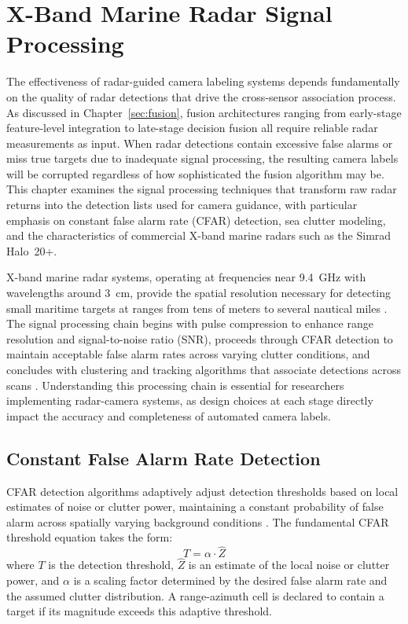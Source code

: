 \section{X-Band Marine Radar Signal Processing}\label{sec:xband}

The effectiveness of radar-guided camera labeling systems depends fundamentally on the quality of radar detections that drive the cross-sensor association process. As discussed in Chapter~\ref{sec:fusion}, fusion architectures ranging from early-stage feature-level integration to late-stage decision fusion all require reliable radar measurements as input. When radar detections contain excessive false alarms or miss true targets due to inadequate signal processing, the resulting camera labels will be corrupted regardless of how sophisticated the fusion algorithm may be. This chapter examines the signal processing techniques that transform raw radar returns into the detection lists used for camera guidance, with particular emphasis on constant false alarm rate (CFAR) detection, sea clutter modeling, and the characteristics of commercial X-band marine radars such as the Simrad Halo~20+.

X-band marine radar systems, operating at frequencies near 9.4~GHz with wavelengths around 3~cm, provide the spatial resolution necessary for detecting small maritime targets at ranges from tens of meters to several nautical miles \cite{Skolnik2008}. The signal processing chain begins with pulse compression to enhance range resolution and signal-to-noise ratio (SNR), proceeds through CFAR detection to maintain acceptable false alarm rates across varying clutter conditions, and concludes with clustering and tracking algorithms that associate detections across scans \cite{Richards2022}. Understanding this processing chain is essential for researchers implementing radar-camera systems, as design choices at each stage directly impact the accuracy and completeness of automated camera labels.

\subsection{Constant False Alarm Rate Detection}

CFAR detection algorithms adaptively adjust detection thresholds based on local estimates of noise or clutter power, maintaining a constant probability of false alarm across spatially varying background conditions \cite{Finn1968}. The fundamental CFAR threshold equation takes the form:
\begin{equation}
T = \alpha \cdot \hat{Z}
\end{equation}
where $T$ is the detection threshold, $\hat{Z}$ is an estimate of the local noise or clutter power, and $\alpha$ is a scaling factor determined by the desired false alarm rate and the assumed clutter distribution. A range-azimuth cell is declared to contain a target if its magnitude exceeds this adaptive threshold.

